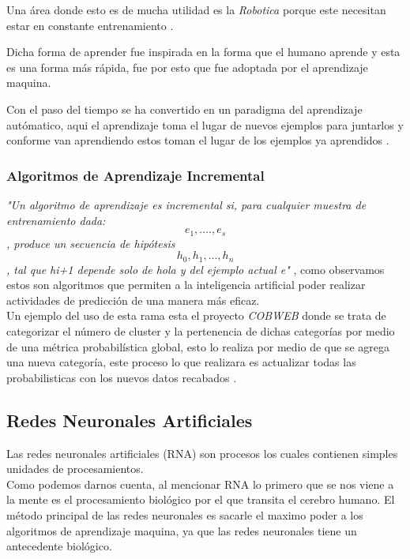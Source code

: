         Una área donde esto es de mucha utilidad es la \textit{Robotica} porque este necesitan estar en constante entrenamiento \cite{GiraudCarrier2000}.

        Dicha forma de aprender fue inspirada en la forma que el humano aprende y esta es una forma más rápida, fue por esto que fue adoptada 
        por el aprendizaje maquina.

        Con el paso del tiempo se ha convertido en un paradigma del aprendizaje autómatico, aqui el aprendizaje toma el lugar de nuevos ejemplos para juntarlos 
        y conforme van aprendiendo estos toman el lugar de los ejemplos ya aprendidos \cite{liu2015}.

        \subsubsection{Algoritmos de Aprendizaje Incremental}
            \textit{"Un algoritmo de aprendizaje es incremental si,
            para cualquier muestra de entrenamiento dada:
            \begin{equation}
                e_{1} , .... , e_{s}
			\end{equation}
            , produce un secuencia de hipótesis 
            \begin{equation}
                h_{0} , h_{1}, . . . , h_{n} 
            \end{equation}
            , tal que hi+1 depende solo de hola y del ejemplo actual e"} \cite{GiraudCarrier2000}, como 
            observamos estos son algoritmos que permiten a la inteligencia artificial poder realizar actividades de predicci\'on 
            de una manera m\'as eficaz.\\
            Un ejemplo del uso de esta rama esta el proyecto \textit{COBWEB} donde se trata de categorizar el n\'umero de cluster y la pertenencia 
            de dichas categor\'ias por medio de una m\'etrica probabil\'istica global, esto lo realiza por medio de que se agrega 
            una nueva categor\'ia, este proceso lo que realizara es actualizar todas las probabilisticas con los nuevos datos recabados \cite{fisher1987}.
    
    \subsection{Redes Neuronales Artificiales}
        
        Las redes neuronales artificiales (RNA) son procesos los cuales contienen simples unidades de procesamientos. \\
        Como podemos darnos cuenta, al mencionar RNA lo primero que se nos viene a la mente es el procesamiento biol\'ogico por el que transita el 
        cerebro humano. El m\'etodo principal de las redes neuronales es sacarle el maximo poder a los algoritmos de aprendizaje maquina, ya que las redes neuronales 
        tiene un antecedente biol\'ogico.

